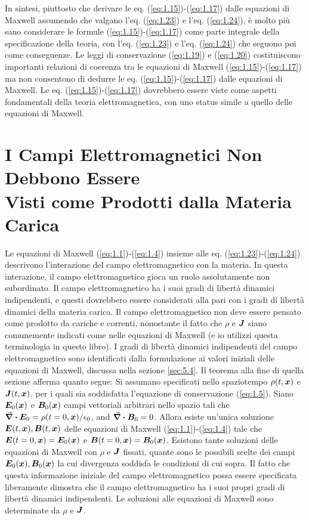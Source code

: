 In sintesi, piuttosto che derivare le eq. (\ref{eq:1.15})-(\ref{eq:1.17}) dalle equazioni di Maxwell assumendo che valgano l'eq. (\ref{eq:1.23}) e l'eq. (\ref{eq:1.24}), è molto più sano considerare le formule (\ref{eq:1.15})-(\ref{eq:1.17}) come parte integrale della specificazione della teoria, con l'eq. (\ref{eq:1.23}) e l'eq. (\ref{eq:1.24}) che seguono poi come conseguenze. Le leggi di conservazione (\ref{eq:1.19}) e (\ref{eq:1.20}) costituiscono importanti relazioni di coerenza tra le equazioni di Maxwell (\ref{eq:1.15})-(\ref{eq:1.17}) ma non consentono di dedurre le eq. (\ref{eq:1.15})-(\ref{eq:1.17}) dalle equazioni di Maxwell. Le eq. (\ref{eq:1.15})-(\ref{eq:1.17}) dovrebbero essere viste come aspetti fondamentali della teoria elettromagnetica, con uno status simile a quello delle equazioni di Maxwell.

\section[Non il Prodotto di Cariche e Correnti]{I Campi Elettromagnetici Non Debbono Essere \\Visti come Prodotti dalla Materia Carica}\label{sec:1.3}
Le equazioni di Maxwell (\ref{eq:1.1})-(\ref{eq:1.4}) insieme alle eq. (\ref{eq:1.23})-(\ref{eq:1.24}) descrivono l'interazione del campo elettromagnetico con la materia. In questa interazione, il campo elettromagnetico gioca un ruolo assolutamente non subordinato. Il campo elettromagnetico ha i suoi gradi di libertà dinamici indipendenti, e questi dovrebbero essere considerati alla pari con i gradi di libertà dinamici della materia carica. Il campo elettromagnetico non deve essere pensato come prodotto da cariche e correnti, nonostante il fatto che $\rho$ e $\vb*{J}$ siano comunemente indicati come  nelle equazioni di Maxwell (e io utilizzi questa terminologia in questo libro). I gradi di libertà dinamici indipendenti del campo elettromagnetico sono identificati dalla formulazione ai valori iniziali delle equazioni di Maxwell, discussa nella sezione \ref{sec:5.4}. Il teorema alla fine di quella sezione afferma quanto segue: 
Si assumano specificati nello spaziotempo $\rho(t, \vb*{x})$ e $\vb*{J}(t, \vb*{x})$, per i quali sia soddisfatta l'equazione di conservazione (\ref{eq:1.5}). 
Siano $\vb*{E}_0(\vb*{x})$ e $\vb*{B}_0(\vb*{x})$ campi vettoriali arbitrari nello spazio tali che $\div{\vb*{E}_0} = \rho(t=0, \vb*{x})/\epsilon_0$, and $\div{\vb*{B}_0} = 0$. 
Allora esiste un'unica soluzione $\vb*{E}(t, \vb*{x}), \vb*{B}(t, \vb*{x})$ delle equazioni di Maxwell (\ref{eq:1.1})-(\ref{eq:1.4}) tale che 
$\vb*{E}(t=0, \vb*{x}) = \vb*{E}_0(\vb*{x})$ e $\vb*{B}(t=0, \vb*{x}) = \vb*{B}_0(\vb*{x})$. Esistono tante soluzioni delle equazioni di Maxwell con 
$\rho$ e $\vb*{J}$ fissati, quante sono le possibili scelte dei campi $\vb*{E}_0(\vb*{x}), \vb*{B}_0(\vb*{x})$ la cui divergenza soddisfa le condizioni di cui sopra. Il fatto che questa informazione iniziale del campo elettromagnetico possa essere specificata liberamente dimostra che il campo elettromagnetico ha i suoi propri gradi di libertà dinamici indipendenti. Le soluzioni alle equazioni di Maxwell  sono determinate da $\rho$ e $\vb*{J}$.

